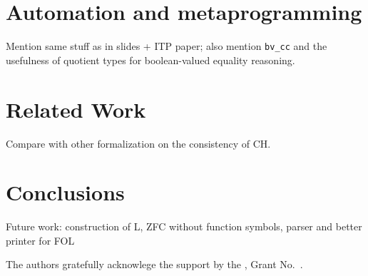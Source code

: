 \documentclass[sigplan,10pt,review, anonymous]{acmart}
\theoremstyle{definition}
\begin{document}
\section{Automation and metaprogramming}

Mention same stuff as in slides + ITP paper; also mention \lstinline{bv_cc} and the usefulness of quotient types for boolean-valued equality reasoning.

\section{Related Work}
\label{section:related-work}
Compare with other formalization on the consistency of CH.

\section{Conclusions}
\label{section:conclusions}
Future work: construction of L, ZFC without function symbols, parser and better printer for FOL

\begin{acks}                            %
  The authors gratefully acknowlege the support by the
  , Grant
  No.~.
\end{acks}




\end{document}
